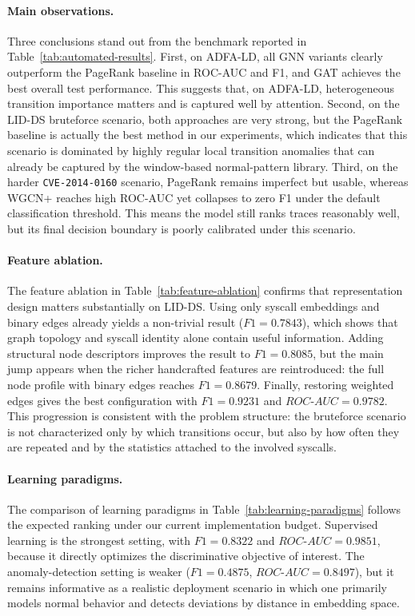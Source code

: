\documentclass{article}
\begin{document}
\paragraph{Main observations.}
Three conclusions stand out from the benchmark reported in Table~\ref{tab:automated-results}. First, on ADFA-LD, all GNN variants clearly outperform the PageRank baseline in ROC-AUC and F1, and GAT achieves the best overall test performance. This suggests that, on ADFA-LD, heterogeneous transition importance matters and is captured well by attention. Second, on the LID-DS bruteforce scenario, both approaches are very strong, but the PageRank baseline is actually the best method in our experiments, which indicates that this scenario is dominated by highly regular local transition anomalies that can already be captured by the window-based normal-pattern library. Third, on the harder \texttt{CVE-2014-0160} scenario, PageRank remains imperfect but usable, whereas WGCN+ reaches high ROC-AUC yet collapses to zero F1 under the default classification threshold. This means the model still ranks traces reasonably well, but its final decision boundary is poorly calibrated under this scenario.

\paragraph{Feature ablation.}
The feature ablation in Table~\ref{tab:feature-ablation} confirms that representation design matters substantially on LID-DS. Using only syscall embeddings and binary edges already yields a non-trivial result ($F1=0.7843$), which shows that graph topology and syscall identity alone contain useful information. Adding structural node descriptors improves the result to $F1=0.8085$, but the main jump appears when the richer handcrafted features are reintroduced: the full node profile with binary edges reaches $F1=0.8679$. Finally, restoring weighted edges gives the best configuration with $F1=0.9231$ and $ROC$-$AUC=0.9782$. This progression is consistent with the problem structure: the bruteforce scenario is not characterized only by which transitions occur, but also by how often they are repeated and by the statistics attached to the involved syscalls.

\paragraph{Learning paradigms.}
The comparison of learning paradigms in Table~\ref{tab:learning-paradigms} follows the expected ranking under our current implementation budget. Supervised learning is the strongest setting, with $F1=0.8322$ and $ROC$-$AUC=0.9851$, because it directly optimizes the discriminative objective of interest. The anomaly-detection setting is weaker ($F1=0.4875$, $ROC$-$AUC=0.8497$), but it remains informative as a realistic deployment scenario in which one primarily models normal behavior and detects deviations by distance in embedding space.
\end{document}
